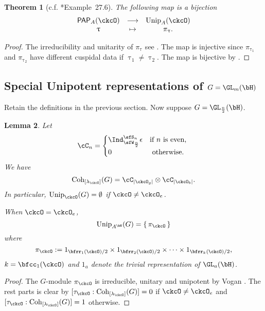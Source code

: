 \documentclass[12pt,a4paper]{amsart}
\def\abs#1{\left|{#1}\right|}
\numberwithin{equation}{section}
\newtheorem{thm}{Theorem}[section]
\newtheorem{lem}[thm]{Lemma}
\theoremstyle{remark}
\def\Unip{\mathrm{Unip}}
\def\lamck{\lambda_\ckcO}
\def\Cint#1{\Coh_{[#1]}}
\def\PP{\mathsf{PAP}}
\def\Coh{\mathrm{Coh}}
\begin{document}
\begin{thm}[c.f. \cite{ABV}*{Example~27.6}]
  The following map is a bijection
  \[
    \begin{array}{ccc}
      \PP_{A}(\ckcO) & \longrightarrow & \Unip_{A}(\ckcO)\\
      \uptau & \mapsto & \pi_{\uptau}.
    \end{array}
  \]
\end{thm}
\begin{proof}
  The irreducibility and unitarity of $\pi_{\uptau}$ see \cite{V.GL}.
  The map is injective since $\pi_{\uptau_{1}}$ and $\pi_{\uptau_{2}}$ have different
  cuspidal data if  $\uptau_{1}\neq \uptau_{2}$.
  The map is bijective by .
\end{proof}

\subsection{Special Unipotent representations of $G=\GL_{m}(\bH)$}

Retain the definitions in the previous section. Now suppose $G = \GL_{\frac{n}{2}}(\bH)$.

\begin{lem}
  Let
  \[
  \cC_{n} = \begin{cases}
    \Ind_{\sfW_{\frac{n}{2}}}^{\sfS_{n}}\epsilon
    & \text{if $n$ is even, }  \\
      0 & \text{ otherwise. } \\
    \end{cases}
  \]
  We have
  \[
    \Cint{\lamck}(G)  =
    \cC_{\abs{\ckcO_{g}}}\otimes \cC_{\abs{\ckcO_{b}}}.
  \]
  In particular, $\Unip_\ckcO(G) = \emptyset$ if $\ckcO \neq \ckcO_e$.

  When $\ckcO = \ckcO_{e}$,
  \[
    \Unip_{A^{\bH}}(G) = \set{\pi_{\ckcO}}
  \]
  where
  \[
    \pi_{\ckcO} := 1_{\bfrr_1(\ckcO)/2}\times 1_{\bfrr_2(\ckcO)/2} \times \cdots
   \times  1_{\bfrr_k(\ckcO)/2},
  \]
  $k = \bfcc_{1}(\ckcO)$
  and $1_{a}$ denote the trivial representation of $\GL_{a}(\bH)$.

\end{lem}
\begin{proof}
  The $G$-module $\pi_{\ckcO}$ is irreducible, unitary and unipotent by Vogan
  \cite{V.GL}.
  The rest parts is clear by $[\tau_{\ckcO}:\Cint{\lamck}(G)] = 0$ if
  $\ckcO \neq \ckcO_{e}$
  and $[\tau_{\ckcO}:\Cint{\lamck}(G)] = 1$ otherwise.
\end{proof}
\end{document}
